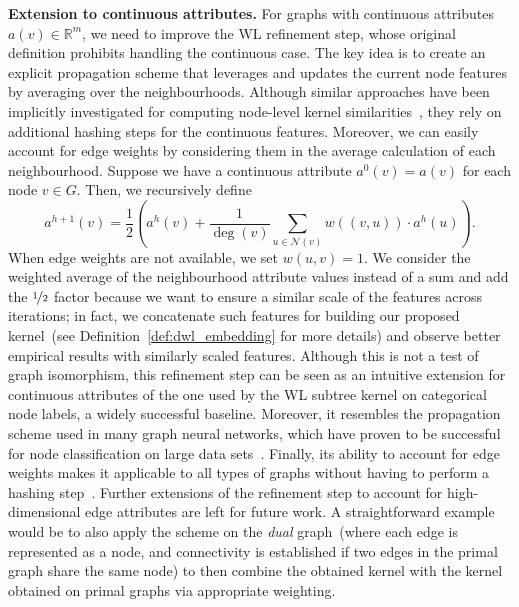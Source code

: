 \documentclass{article}
\DeclareMathOperator{\degree}{deg}
\begin{document}
\textbf{Extension to continuous attributes.} For graphs with continuous attributes $a(v)\in\mathbb{R}^{m}$, we need to improve the WL refinement step, whose original definition prohibits handling the continuous case. The key idea is to create an explicit propagation scheme that leverages and updates the current node features by averaging over the neighbourhoods.
Although similar approaches have been implicitly investigated for computing node-level kernel similarities~\citep{neumann2016, morris2016faster}, they rely on additional hashing steps for the continuous features. 
Moreover, we can easily account for edge weights by considering them in the average calculation of each neighbourhood.
Suppose we have a continuous attribute $a^{0}(v) = a(v)$ for each node $v \in G$. Then, we recursively define
\begin{equation}
a^{h+1}(v) =  \frac{1}{2}\left(a^{h}(v) + \frac{1}{\degree(v)}  \sum_{u\in \mathcal{N}(v)} w\left(\left(v,u\right)\right)\cdot a^{h}(u)\right).
\end{equation}
When edge weights are not available, we set $w(u, v) = 1$.
We consider the weighted average of the neighbourhood attribute values instead of a sum and add the $\nicefrac{1}{2}$ factor because we want to ensure a similar scale of the features across iterations; in fact, we  concatenate such features for building our proposed kernel~(see Definition~\ref{def:dwl_embedding} for more details) and observe better empirical results with similarly scaled features. 
Although this is not a test of graph isomorphism, this refinement step can be seen as an intuitive extension for continuous attributes of the one used by the WL subtree kernel on categorical node labels, a widely successful baseline. 
Moreover, it resembles the propagation scheme used in many graph neural networks, which have proven to be successful for node classification on large data sets~\citep{duvenaud2015convolutional, kipf2017semi, klicpera2018combining}. 
Finally, its ability to account for edge weights makes it applicable to all types of graphs without having to perform a hashing step~\citep{morris2016faster}. 
Further extensions of the refinement step to account for high-dimensional edge attributes are left for future work. A straightforward example would be to also apply the scheme on the \emph{dual} graph~(where each edge is represented as a node, and connectivity is established if two edges in the primal graph share the same node) to then combine the obtained kernel with the kernel obtained on primal graphs via appropriate weighting. 
\end{document}

